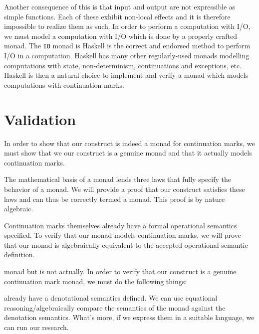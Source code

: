 \documentclass[ms]{byuprop}
\begin{document}
Another consequence of this is that input and output are not expressible as simple
functions. Each of these exhibit non-local effects and it is therefore impossible to
realize them as such. In order to perform a computation with I/O, we must model a
computation with I/O which is done by a properly crafted monad. The \texttt{IO} monad is
Haskell is the correct and endorsed method to perform I/O in a computation. Haskell has
many other regularly-used monads modelling computations with state, non-determinism,
continuations and exceptions, etc. Haskell is then a natural choice to implement and
verify a monad which models computations with continuation marks.

\section{Validation}


In order to show that our construct is indeed a monad for continuation marks, we must show
that we our construct is a genuine monad and that it actually models continuation marks.

The mathematical basis of a monad lends three laws that fully specify the behavior of a 
monad. We will provide a proof that our construct satisfies these laws and can thus be 
correctly termed a monad. This proof is by nature algebraic.

Continuation marks themselves already have a formal operational semantics specified. To 
verify that our monad models continuation marks, we will prove that our monad is 
algebraically equivalent to the accepted operational semantic definition.

monad but is not actually. In order to verify that our construct is a genuine continuation
mark monad, we must do the following things:

already have a denotational semantics defined. We can use equational
reasoning/algebraically compare the semantics of the monad against the denotation
semantics. What's more, if we express them in a suitable language, we can run our
research.
\end{document}
